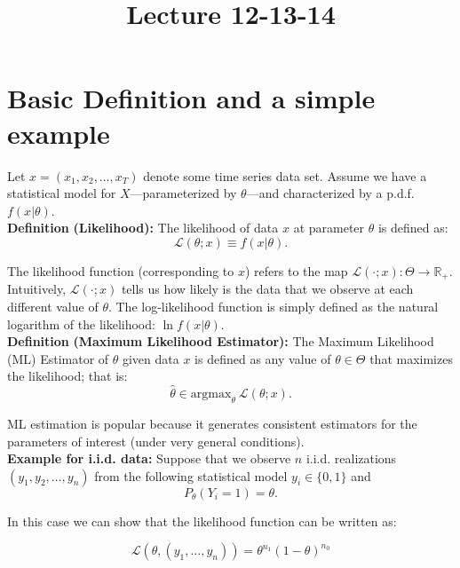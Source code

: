 \documentclass[12] {article}
\begin{document}
\onehalfspace

\title{Lecture 12-13-14}
\date{}
\maketitle



\section{Basic Definition and a simple example}

Let $x = (x_1, x_2, \ldots, x_{T})$ denote some time series data set. Assume we have a statistical model for $X$---parameterized by $\theta$---and characterized by a p.d.f. $f(x | \theta)$.\\


\noindent \textbf{Definition} \textbf{(Likelihood):} The likelihood of data $x$ at parameter $\theta$ is defined as:
\[\mathcal{L}(\theta; x) \equiv f(x|\theta). \]

\noindent The likelihood function (corresponding to $x$) refers to the map $\mathcal{L}(\cdot; x): \Theta \rightarrow \mathbb{R}_{+}$. \\

\noindent Intuitively, $\mathcal{L}(\cdot; x)$ tells us how likely is the data that we observe at each different value of $\theta$. The log-likelihood function is simply defined as the natural logarithm of the likelihood: $\ln f(x | \theta)$.\\

\noindent \textbf{Definition} \textbf{(Maximum Likelihood Estimator):} The Maximum Likelihood (ML) Estimator of $\theta$ given data $x$ is defined as any value of $\theta \in \Theta$ that maximizes the likelihood; that is:
\[  \widehat{\theta} \in \textrm{argmax}_{\theta} \: \mathcal{L}(\theta; x). \]

ML estimation is popular because it generates consistent estimators for the parameters of interest (under very general conditions).\\

\noindent \textbf{Example for i.i.d. data:} Suppose that we observe $n$ i.i.d. realizations $(y_1,y_2, \ldots, y_n)$ from the following statistical model $y_i \in \{0,1\}$ and
\[ P_{\theta}(Y_i= 1) = \theta.\]

\noindent In this case we can show that the likelihood function can be written as:

$$ \mathcal{L}(\theta, (y_1, \ldots, y_n) ) = \theta^{n_1} (1-\theta)^{n_0} $$
\end{document}
